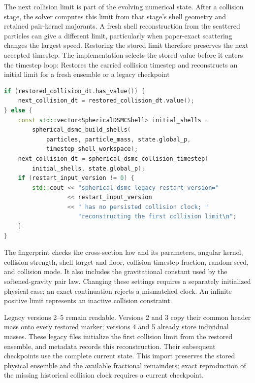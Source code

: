 The next collision limit is part of the evolving numerical state.  After a
collision stage, the solver computes this limit from that stage's shell
geometry and retained pair-kernel majorants.  A fresh shell reconstruction
from the scattered particles can give a different limit, particularly when
paper-exact scattering changes the largest speed.  Restoring the stored
limit therefore preserves the next accepted timestep.  The implementation
selects the stored value before it enters the timestep loop:
{}
{Restores the carried collision timestep and reconstructs an initial limit
 for a fresh ensemble or a legacy checkpoint}
\begin{lstlisting}[language=C++]
if (restored_collision_dt.has_value()) {
    next_collision_dt = restored_collision_dt.value();
} else {
    const std::vector<SphericalDSMCShell> initial_shells =
        spherical_dsmc_build_shells(
            particles, particle_mass, state.global_p,
            timestep_shell_workspace);
    next_collision_dt = spherical_dsmc_collision_timestep(
        initial_shells, state.global_p);
    if (restart_input_version != 0) {
        std::cout << "spherical_dsmc legacy restart version="
                  << restart_input_version
                  << " has no persisted collision clock; "
                     "reconstructing the first collision limit\n";
    }
}
\end{lstlisting}
The fingerprint checks the cross-section law and its parameters, angular
kernel, collision strength, shell target and floor, collision timestep
fraction, random seed, and collision mode.  It also includes the gravitational
constant used by the softened-gravity pair law.  Changing these settings
requires a separately initialized physical case; an exact continuation
rejects a mismatched clock.  An infinite positive limit represents an
inactive collision constraint.

Legacy versions 2--5 remain readable.  Versions 2 and 3 copy their common
header mass onto every restored marker; versions 4 and 5 already store
individual masses.  These legacy files initialize the first collision limit
from the restored ensemble, and metadata records this reconstruction.  Their
subsequent checkpoints use the complete current state.  This import preserves
the stored physical ensemble and the available fractional remainders; exact
reproduction of the missing historical collision clock requires a current
checkpoint.

